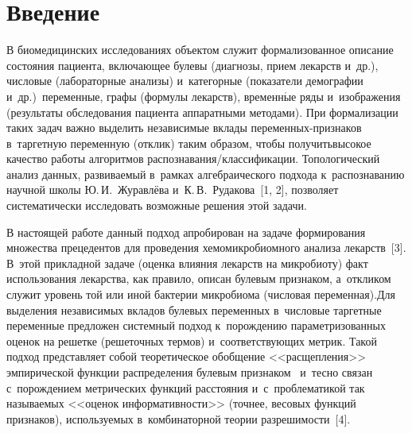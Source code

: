 
  



\thispagestyle{headings}

\begin{multicols}{2}

\label{st\stat}

\section{Введение}

     В биомедицинских исследованиях объектом служит формализованное 
описание со\-сто\-яния пациента, вклю\-ча\-ющее булевы (диагнозы, прием 
лекарств и~др.), чис\-ло\-вые (лабораторные анализы) и~категорные (показатели 
демографии и~др.)\ переменные, графы (формулы лекарств), временн$\acute{\mbox{ы}}$е ряды 
и~изображения (результаты обследования пациента аппаратными методами). 
При формализации таких задач важ\-но выделить независимые вклады 
пе\-ре\-мен\-ных-при\-зна\-ков в~таргетную переменную (отклик) таким образом, 
чтобы получить\linebreak высокое качество работы алгоритмов 
рас\-по\-зна\-ва\-ния/клас\-си\-фи\-ка\-ции. Топологический анализ данных, раз\-ви\-ва\-емый 
в~рамках ал\-геб\-ра\-и\-че\-ско\-го \mbox{подхода} к~распознаванию научной школы 
Ю.\,И.~Журавлёва и~К.\,В.~Рудакова~[1, 2], поз\-во\-ля\-ет сис\-те\-ма\-ти\-че\-ски 
исследовать воз\-мож\-ные решения этой за\-дачи. 
     
     В настоящей работе данный подход апробирован на задаче 
формирования множества прецедентов для проведения хе\-мо\-мик\-ро\-би\-ом\-но\-го 
анализа лекарств~[3]. В~этой при\-клад\-ной задаче (оцен\-ка вли\-яния лекарств на 
микробиоту) факт использования лекарства, как правило, описан булевым 
при\-зна\-ком, а~от\-кли\-ком служит уровень той или иной бактерии мик\-ро\-био\-ма 
(чис\-ло\-вая переменная).\linebreak Для выделения независимых вкла\-дов булевых 
переменных в~чис\-ло\-вые таргетные переменные предложен сис\-тем\-ный 
подход к~по\-рож\-де\-нию па\-ра\-мет\-ри\-зо\-ван\-ных оценок на решетке (решеточных 
термов) и~со\-от\-вет\-ст\-ву\-ющих мет\-рик. Такой подход пред\-став\-ля\-ет собой 
тео\-ре\-ти\-че\-ское обобщение <<рас\-щеп\-ле\-ния>> эмпирической функции 
распределения булевым признаком~\cite{2-tor} и~тесно связан 
с~по\-рож\-де\-ни\-ем мет\-ри\-че\-ских функций рас\-сто\-яния и~с~проб\-ле\-ма\-ти\-кой так 
на\-зы\-ва\-емых <<оценок ин\-фор\-ма\-тив\-ности>> (точ\-нее, весовых функций 
при\-зна\-ков), ис\-поль\-зу\-емых в~комбинаторной тео\-рии раз\-ре\-ши\-мости~[4].


\end{multicols}
